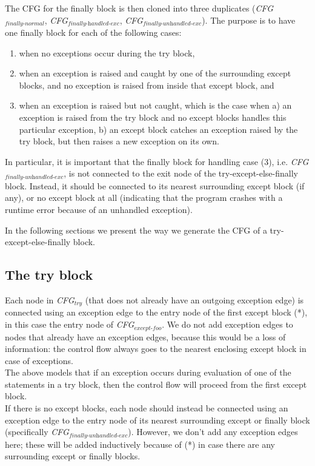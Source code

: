 The CFG for the finally block is then cloned into three duplicates (\textit{CFG$_{\textit{finally-normal}}$}, 
\textit{CFG$_{\textit{finally-handled-exc}}$}, \textit{CFG$_{\textit{finally-unhandled-exc}}$}). The purpose is to have one finally block for each of the following cases: 

\begin{enumerate}
  \item when no exceptions occur during the try block,
  \item when an exception is raised and caught by one of the surrounding except blocks, and no exception is raised from inside that except block, and
  \item when an exception is raised but not caught, which is the case when 
    a) an exception is raised from the try block and no except blocks handles this particular exception, 
    b) an except block catches an exception raised by the try block, but then raises a new exception on its own.
\end{enumerate}

\begin{sloppypar}
  In particular, it is important that the finally block for handling case (3), i.e. \textit{CFG$_{\textit{finally-unhandled-exc}}$}, 
  is not connected to the exit node of the try-except-else-finally block. Instead, it should be connected to its nearest surrounding except block (if any), 
  or no except block at all (indicating that the program crashes with a runtime error because of an unhandled exception).
\end{sloppypar}

In the following sections we present the way we generate the CFG of a try-except-else-finally block.

\subsection{The try block}
Each node in \textit{CFG$_{\textit{try}}$} (that does not already have an outgoing exception edge) is connected using an exception edge to the entry node of the first except block (*), in this case the entry node of \textit{CFG$_{\textit{except-foo}}$}. We do not add exception edges to nodes that already have an exception edges, because this would be a loss of information: the control flow always goes to the nearest enclosing except block in case of exceptions. \\
The above models that if an exception occurs during evaluation of one of the statements in a try block, then the control flow will proceed from the first except block. \\
If there is no except blocks, each node should instead be connected using an exception edge to the entry node of its nearest surrounding except or finally block (specifically \textit{CFG$_{\textit{finally-unhandled-exc}}$}). However, we don't add any exception edges here; these will be added inductively because of (*) in case there are any surrounding except or finally blocks.

